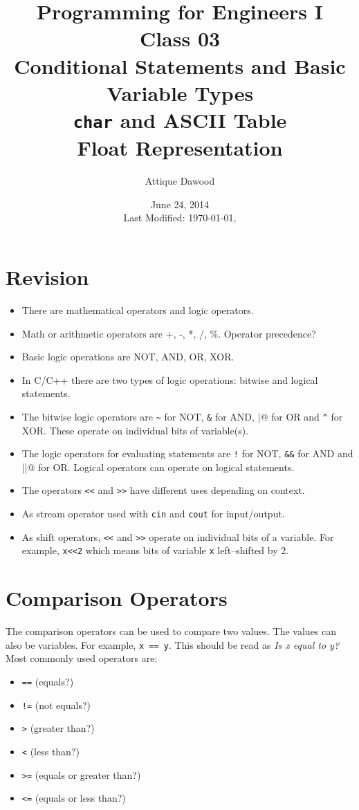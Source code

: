 \documentclass[12pt,a4paper]{article}
\title{Programming for Engineers I\\Class 03\\Conditional Statements and Basic Variable Types\\ \texttt{char} and ASCII Table\\Float Representation}
\author{Attique Dawood}
\date{June 24, 2014\\[0.2cm] Last Modified: \today, \currenttime}
\begin{document}
\maketitle
\section{Revision}
\begin{itemize}
\item There are mathematical operators and logic operators.
\item Math or arithmetic operators are +, -, *, /, \%. Operator precedence?
\item Basic logic operations are NOT, AND, OR, XOR.
\item In C/C++ there are two types of logic operations: bitwise and logical statements.
\item The bitwise logic operators are \verb|~| for NOT, \verb|&| for AND, \verb@|@ for OR and \verb|^| for XOR. These operate on individual bits of variable(s).
\item The logic operators for evaluating statements are \verb|!| for NOT, \verb|&&| for AND and \verb@||@ for OR. Logical operators can operate on logical statements.
\item The operators \verb|<<| and \verb|>>| have different uses depending on context.
\item As stream operator used with \verb|cin| and \verb|cout| for input/output.
\item As shift operators, \verb|<<| and \verb|>>| operate on individual bits of a variable. For example, \verb|x<<2| which means bits of variable \verb|x| left--shifted by 2.
\end{itemize}
\section{Comparison Operators}
The comparison operators can be used to compare two values. The values can also be variables.  For example, \verb|x == y|. This should be read as \textit{Is x equal to y?} Most commonly used operators are:
\begin{itemize}
\item \verb|==| (equals?)
\item \verb|!=| (not equals?)
\item \verb|>| (greater than?)
\item \verb|<| (less than?)
\item \verb|>=| (equals or greater than?)
\item \verb|<=| (equals or less than?)
\end{itemize}
\end{document}
